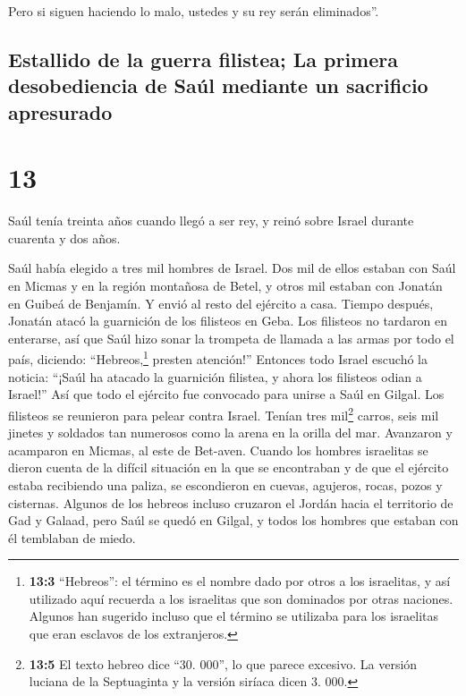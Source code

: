  Pero si siguen haciendo lo malo, ustedes y su rey serán
eliminados''.

\hypertarget{estallido-de-la-guerra-filistea-la-primera-desobediencia-de-sauxfal-mediante-un-sacrificio-apresurado}{%
\subsection{Estallido de la guerra filistea; La primera desobediencia de
Saúl mediante un sacrificio
apresurado}\label{estallido-de-la-guerra-filistea-la-primera-desobediencia-de-sauxfal-mediante-un-sacrificio-apresurado}}

\hypertarget{section-12}{%
\section{13}\label{section-12}}

 Saúl tenía treinta años cuando llegó a ser rey, y reinó
sobre Israel durante cuarenta y dos años.

 Saúl había elegido a tres mil hombres de Israel. Dos mil
de ellos estaban con Saúl en Micmas y en la región montañosa de Betel, y
otros mil estaban con Jonatán en Guibeá de Benjamín. Y envió al resto
del ejército a casa.  Tiempo después, Jonatán atacó la
guarnición de los filisteos en Geba. Los filisteos no tardaron en
enterarse, así que Saúl hizo sonar la trompeta de llamada a las armas
por todo el país, diciendo: ``Hebreos,\footnote{\textbf{13:3}
  ``Hebreos'': el término es el nombre dado por otros a los israelitas,
  y así utilizado aquí recuerda a los israelitas que son dominados por
  otras naciones. Algunos han sugerido incluso que el término se
  utilizaba para los israelitas que eran esclavos de los extranjeros.}
presten atención!''  Entonces todo Israel escuchó la
noticia: ``¡Saúl ha atacado la guarnición filistea, y ahora los
filisteos odian a Israel!'' Así que todo el ejército fue convocado para
unirse a Saúl en Gilgal.  Los filisteos se reunieron para
pelear contra Israel. Tenían tres mil\footnote{\textbf{13:5} El texto
  hebreo dice ``30. 000'', lo que parece excesivo. La versión luciana de
  la Septuaginta y la versión siríaca dicen 3. 000.} carros, seis mil
jinetes y soldados tan numerosos como la arena en la orilla del mar.
Avanzaron y acamparon en Micmas, al este de Bet-aven. 
Cuando los hombres israelitas se dieron cuenta de la difícil situación
en la que se encontraban y de que el ejército estaba recibiendo una
paliza, se escondieron en cuevas, agujeros, rocas, pozos y cisternas.
 Algunos de los hebreos incluso cruzaron el Jordán hacia
el territorio de Gad y Galaad, pero Saúl se quedó en Gilgal, y todos los
hombres que estaban con él temblaban de miedo.

